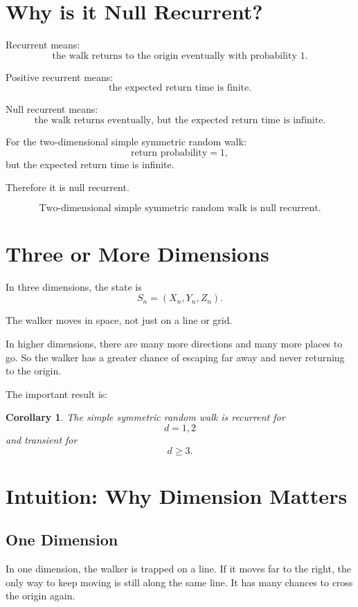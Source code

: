\documentclass[12pt,a4paper]{article}
\theoremstyle{notestyle}
\newtheorem{corollary}{Corollary}
\begin{document}
\section{Why is it Null Recurrent?}

Recurrent means:
\[
\text{the walk returns to the origin eventually with probability }1.
\]

Positive recurrent means:
\[
\text{the expected return time is finite}.
\]

Null recurrent means:
\[
\text{the walk returns eventually, but the expected return time is infinite}.
\]

For the two-dimensional simple symmetric random walk:
\[
\text{return probability}=1,
\]
but the expected return time is infinite.

Therefore it is null recurrent.

\[
\boxed{\text{Two-dimensional simple symmetric random walk is null recurrent.}}
\]

\section{Three or More Dimensions}

In three dimensions, the state is
\[
S_n=(X_n,Y_n,Z_n).
\]

The walker moves in space, not just on a line or grid.

In higher dimensions, there are many more directions and many more places to go. So the walker has a greater chance of escaping far away and never returning to the origin.

The important result is:

\begin{corollary}
The simple symmetric random walk is recurrent for
\[
d=1,2
\]
and transient for
\[
d\geq 3.
\]
\end{corollary}

\section{Intuition: Why Dimension Matters}

\subsection*{One Dimension}

In one dimension, the walker is trapped on a line. If it moves far to the right, the only way to keep moving is still along the same line. It has many chances to cross the origin again.
\end{document}

